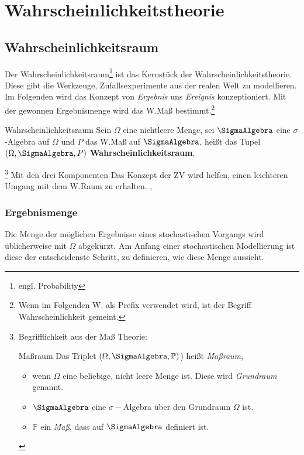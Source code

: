 \pagebreak
\section{Wahrscheinlichkeitstheorie}


\subsection{Wahrscheinlichkeitsraum}
Der Wahrscheinlichkeitsraum\footnote{engl. Probability} ist das Kernstück der Wahrscheinlichkeitstheorie. Diese gibt die Werkzeuge, Zufallsexperimente aus der realen Welt zu modellieren.\\

Im Folgenden wird das Konzept von \textit{Ergebnis} uns \textit{Ereignis} konzeptioniert. Mit der gewonnen Ergebnismenge wird das \gls{W.}Maß bestimmt.\footnote{Wenn im Folgenden \gls{W.} als Prefix verwendet wird, ist der Begriff Wahrscheinlichkeit gemeint.}
\begin{Definition}{Wahrscheinlichkeitsraum}
	Sein $\Omega$ eine nichtleere Menge, sei $\SigmaAlgebra$ eine $\sigma$-Algebra auf $\Omega$ und $P$ das \gls{W.}Maß auf $\SigmaAlgebra$, heißt das Tupel $\left(\Omega, \SigmaAlgebra, P\right)$ \textbf{Wahrscheinlichkeitsraum}.
\end{Definition} \footnote{Begrifflichkeit aus der Maß Theorie: \begin{Lemma-Definition}{Maßraum}
	Das Triplet $(\Omega, \SigmaAlgebra, \mathbb{P})$) heißt \textit{Maßraum}, \begin{itemize}
		\item wenn $\Omega$ eine beliebige, nicht leere Menge ist. Diese wird \textit{Grundraum} genannt.
		\item $\SigmaAlgebra$ eine $\sigma-$Algebra über den Grundraum $\Omega$ ist.
		\item $\mathbb{P}$ ein \textit{Maß}, dass auf $\SigmaAlgebra$ definiert ist.
	\end{itemize}
\end{Lemma-Definition}}
Mit den drei Komponenten
Das Konzept der \gls{ZV} wird helfen, einen leichteren Umgang mit dem \gls{W.}Raum zu erhalten. \cite{Mathematik.Arens}, \cite{Stochastik.Henze}

\subsubsection{Ergebnismenge}
Die Menge der möglichen Ergebnisse eines stochastischen Vorgangs wird üblicherweise mit $\Omega$ abgekürzt. Am Anfang einer stochastischen Modellierung ist diese der entscheidenste Schritt, zu definieren, wie diese Menge aussieht. 

